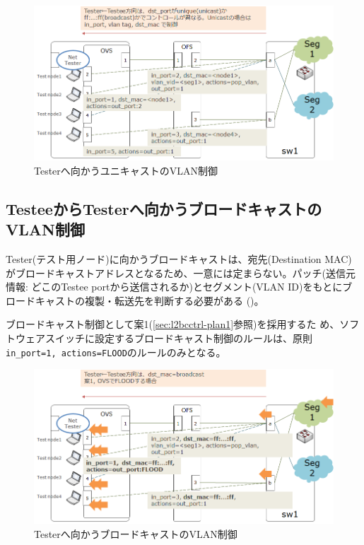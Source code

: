 \begin{figure}[h]
 \centering
 \includegraphics[scale=0.6]{img/vlan-testee2tester.png}
 \caption{Testerへ向かうユニキャストのVLAN制御}
 \label{fig:vlan-testee2tester}
\end{figure}

  \subsection{TesteeからTesterへ向かうブロードキャストのVLAN制御}
  \label{sec:vlan-ctrl-testee2tester-broadcast}

Tester(テスト用ノード)に向かうブロードキャストは、宛先(Destination MAC)
がブロードキャストアドレスとなるため、一意には定まらない。パッチ(送信元
情報: どこのTestee portから送信されるか)とセグメント(VLAN ID)をもとにブ
ロードキャストの複製・転送先を判断する必要がある
()。

ブロードキャスト制御として案1(\ref{sec:l2bcctrl-plan1}参照)を採用するた
め、ソフトウェアスイッチに設定するブロードキャスト制御のルールは、原則
\verb|in_port=1, actions=FLOOD|のルールのみとなる。
\begin{figure}[h]
 \centering
 \includegraphics[scale=0.6]{img/vlan-testee2tester-bcplan1.png}
 \caption{Testerへ向かうブロードキャストのVLAN制御}
 \label{fig:vlan-testee2tester-bcplan1}
\end{figure}

